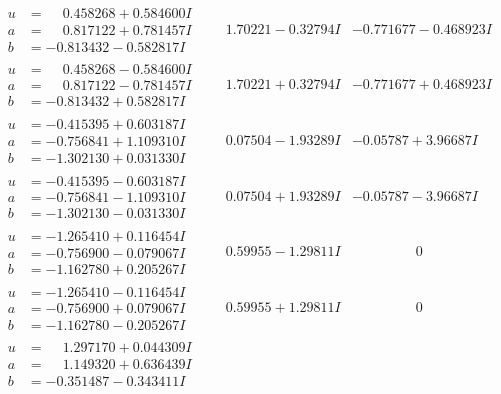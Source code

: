 \documentclass[1p]{elsarticle_modified}
\theoremstyle{definition}
\begin{document}
$$\begin{array}{c|c|c}
\begin{aligned}
u &= \phantom{-}0.458268 + 0.584600 I \\
a &= \phantom{-}0.817122 + 0.781457 I \\
b &= -0.813432 - 0.582817 I\end{aligned}
 & \phantom{-}1.70221 - 0.32794 I & -0.771677 - 0.468923 I \\ \hline\begin{aligned}
u &= \phantom{-}0.458268 - 0.584600 I \\
a &= \phantom{-}0.817122 - 0.781457 I \\
b &= -0.813432 + 0.582817 I\end{aligned}
 & \phantom{-}1.70221 + 0.32794 I & -0.771677 + 0.468923 I \\ \hline\begin{aligned}
u &= -0.415395 + 0.603187 I \\
a &= -0.756841 + 1.109310 I \\
b &= -1.302130 + 0.031330 I\end{aligned}
 & \phantom{-}0.07504 - 1.93289 I & -0.05787 + 3.96687 I \\ \hline\begin{aligned}
u &= -0.415395 - 0.603187 I \\
a &= -0.756841 - 1.109310 I \\
b &= -1.302130 - 0.031330 I\end{aligned}
 & \phantom{-}0.07504 + 1.93289 I & -0.05787 - 3.96687 I \\ \hline\begin{aligned}
u &= -1.265410 + 0.116454 I \\
a &= -0.756900 - 0.079067 I \\
b &= -1.162780 + 0.205267 I\end{aligned}
 & \phantom{-}0.59955 - 1.29811 I & \phantom{-0.000000 } 0 \\ \hline\begin{aligned}
u &= -1.265410 - 0.116454 I \\
a &= -0.756900 + 0.079067 I \\
b &= -1.162780 - 0.205267 I\end{aligned}
 & \phantom{-}0.59955 + 1.29811 I & \phantom{-0.000000 } 0 \\ \hline\begin{aligned}
u &= \phantom{-}1.297170 + 0.044309 I \\
a &= \phantom{-}1.149320 + 0.636439 I \\
b &= -0.351487 - 0.343411 I\end{aligned}

\end{array}$$
\end{document}
